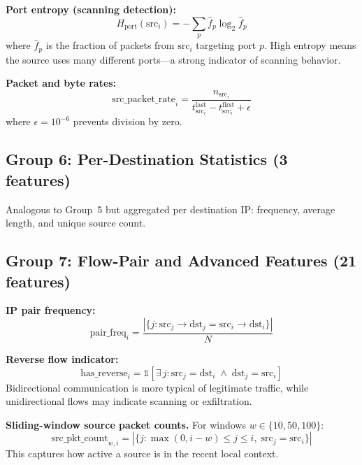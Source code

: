 \documentclass[conference]{IEEEtran}
\begin{document}
\textbf{Port entropy (scanning detection):}
\begin{equation}
    H_{\text{port}}(\text{src}_i) = - \sum_{p} \hat{f}_p \log_2 \hat{f}_p
\end{equation}
where $\hat{f}_p$ is the fraction of packets from $\text{src}_i$ targeting port $p$. High entropy means the source uses many different ports---a strong indicator of scanning behavior.

\textbf{Packet and byte rates:}
\begin{equation}
    \text{src\_packet\_rate}_i = \frac{n_{\text{src}_i}}{t^{\text{last}}_{\text{src}_i} - t^{\text{first}}_{\text{src}_i} + \epsilon}
\end{equation}
where $\epsilon = 10^{-6}$ prevents division by zero.

\subsection{Group 6: Per-Destination Statistics (3 features)}

Analogous to Group~5 but aggregated per destination IP: frequency, average length, and unique source count.

\subsection{Group 7: Flow-Pair and Advanced Features (21 features)}

\textbf{IP pair frequency:}
\begin{equation}
    \text{pair\_freq}_i = \frac{|\{j : \text{src}_j \to \text{dst}_j = \text{src}_i \to \text{dst}_i\}|}{N}
\end{equation}

\textbf{Reverse flow indicator:}
\begin{equation}
    \text{has\_reverse}_i = \mathbb{1}[\exists\, j : \text{src}_j = \text{dst}_i \;\wedge\; \text{dst}_j = \text{src}_i]
\end{equation}
Bidirectional communication is more typical of legitimate traffic, while unidirectional flows may indicate scanning or exfiltration.

\textbf{Sliding-window source packet counts.} For windows $w \in \{10, 50, 100\}$:
\begin{equation}
    \text{src\_pkt\_count}_{w,i} = |\{j : \max(0, i-w) \leq j \leq i,\; \text{src}_j = \text{src}_i\}|
\end{equation}
This captures how active a source is in the recent local context.
\end{document}
